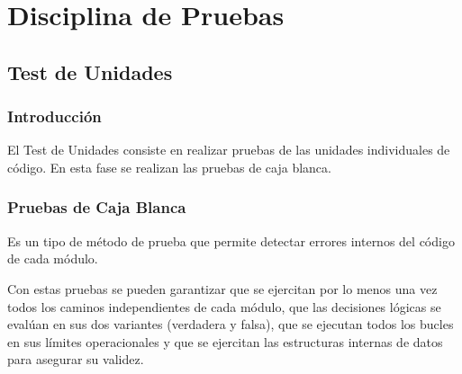 
\chapter{Disciplina de Pruebas}
\label{chap:pruebas}

\section{Test de Unidades}
\subsection{Introducción}

El Test de Unidades consiste en realizar pruebas de las unidades individuales de código. En esta fase se realizan las pruebas de caja blanca. 

\subsection{Pruebas de Caja Blanca}
Es un tipo de método de prueba que permite detectar errores internos del código de cada módulo. 

Con estas pruebas se pueden garantizar que se ejercitan por lo menos una vez todos los caminos independientes de cada módulo, que las decisiones lógicas se evalúan en sus dos variantes (verdadera y falsa), que se ejecutan todos los bucles en sus límites operacionales y que se ejercitan las estructuras internas de datos para asegurar su validez.

